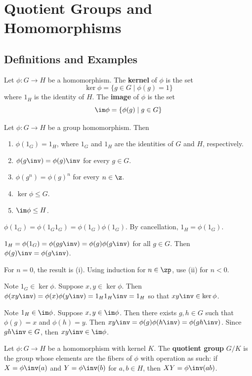 \section{Quotient Groups and Homomorphisms}

\subsection{Definitions and Examples} \label{sec3.1}

 Let $\phi : G \to H$ be a homomorphism. The \textbf{kernel} of $\phi$ is the set
\[\ker\phi = \{g \in G \mid \phi(g) = 1\}\]
where $1_H$ is the identity of $H$. The \textbf{image} of $\phi$ is the set
\[\im\phi = \{\phi(g) \mid g \in G\}\]

 \label{prop3.1}
Let $\phi : G \to H$ be a group homomorphism. Then
\begin{enumerate}
    \item $\phi(1_G) = 1_H$, where $1_G$ and $1_H$ are the identities of $G$ and $H$, respectively.
    \item $\phi(g\inv) = \phi(g)\inv$ for every $g \in G$.
    \item $\phi(g^n) = \phi(g)^n$ for every $n \in \z$.
    \item $\ker\phi \leq G$.
    \item $\im\phi \leq H$.
\end{enumerate}

\begin{proofnum}
    \item $\phi(1_G) = \phi(1_G1_G) = \phi(1_G)\phi(1_G)$. By cancellation, $1_H = \phi(1_G)$.
    \item $1_H = \phi(1_G) = \phi(gg\inv) = \phi(g)\phi(g\inv)$ for all $g \in G$. Then $\phi(g)\inv = \phi(g\inv)$.
    \item For $n = 0$, the result is (i). Using induction for $n \in \zp$, use (ii) for $n < 0$.
    \item Note $1_G \in \ker\phi$. Suppose $x, y \in \ker\phi$. Then $\phi(xy\inv) = \phi(x)\phi(y\inv) = 1_H1_H\inv = 1_H$ so that $xy\inv \in \ker\phi$.
    \item Note $1_H \in \im\phi$. Suppose $x, y \in \im\phi$. Then there exists $g, h \in G$ such that $\phi(g) = x$ and $\phi(h) = y$. Then $xy\inv = \phi(g)\phi(h\inv) = \phi(gh\inv)$. Since $gh\inv \in G$, then $xy\inv \in \im\phi$.
\end{proofnum}

 Let $\phi : G \to H$ be a homomorphism with kernel $K$. The \textbf{quotient group} $G/K$ is the group whose elements are the fibers of $\phi$ with operation as such: if $X = \phi\inv(a)$ and $Y = \phi\inv(b)$ for $a, b \in H$, then $XY = \phi\inv(ab)$.

